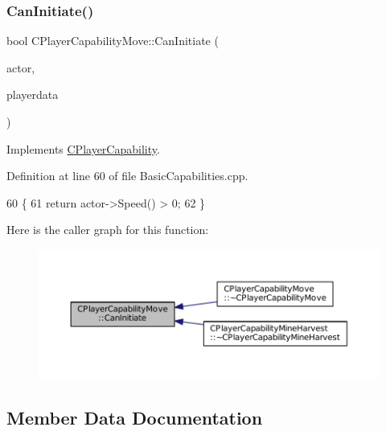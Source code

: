 \subsubsection{\texorpdfstring{Can\+Initiate()}{CanInitiate()}}
{\footnotesize\ttfamily bool C\+Player\+Capability\+Move\+::\+Can\+Initiate (\begin{DoxyParamCaption}\item[{std\+::shared\+\_\+ptr$<$ \hyperlink{classCPlayerAsset}{C\+Player\+Asset} $>$}]{actor,  }\item[{std\+::shared\+\_\+ptr$<$ \hyperlink{classCPlayerData}{C\+Player\+Data} $>$}]{playerdata }\end{DoxyParamCaption})\hspace{0.3cm}{\ttfamily [virtual]}}



Implements \hyperlink{classCPlayerCapability_aa83b1e1fcaff2985c378132d679154ea}{C\+Player\+Capability}.



Definition at line 60 of file Basic\+Capabilities.\+cpp.


\begin{DoxyCode}
60                                                                                                            
              \{
61     \textcolor{keywordflow}{return} actor->Speed() > 0;
62 \}
\end{DoxyCode}
Here is the caller graph for this function\+:\nopagebreak
\begin{figure}[H]
\begin{center}
\leavevmode
\includegraphics[width=350pt]{classCPlayerCapabilityMove_aef25bc0d224e993c46f5cd4cd6b8b7c8_icgraph}
\end{center}
\end{figure}


\subsection{Member Data Documentation}
\hypertarget{classCPlayerCapabilityMove_a6b1de1f3d299621bc3d6020111bb8253}{}\label{classCPlayerCapabilityMove_a6b1de1f3d299621bc3d6020111bb8253} 
